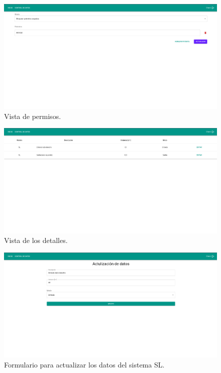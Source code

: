 \begin{figure}[bth]
    \centering
    \includegraphics[width=\textwidth]{imgs/server/in-type.png}
    \caption{Vista de permisos.}
    \label{fig:in-type}
\end{figure}
\begin{figure}[bth]
    \centering
    \includegraphics[width=\textwidth]{imgs/server/client-barriers-details.png}
    \caption{Vista de los detalles.}
    \label{fig:barrier-details}
\end{figure}

\begin{figure}[bth]
    \centering
    \includegraphics[width=\textwidth]{imgs/server/barrier-update-data.png}
    \caption{Formulario para actualizar los datos del sistema SL.}
    \label{fig:update-barrier}
\end{figure}

